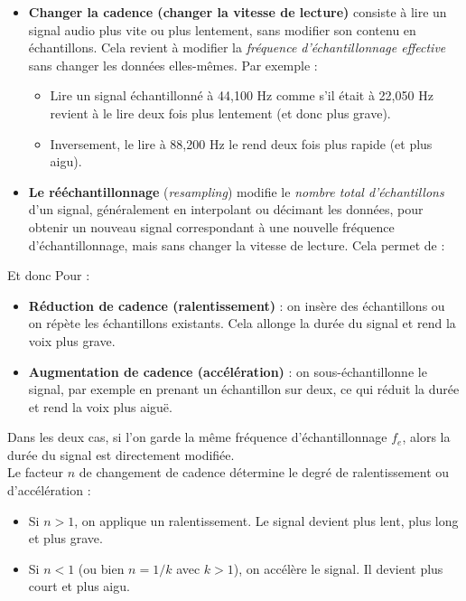 \begin{itemize}
    \item \textbf{Changer la cadence (changer la vitesse de lecture)} consiste à lire un signal audio plus vite ou plus lentement, sans modifier son contenu en échantillons. Cela revient à modifier la \textit{fréquence d’échantillonnage effective} sans changer les données elles-mêmes. Par exemple :
    \begin{itemize}
        \item Lire un signal échantillonné à 44{,}100 Hz comme s’il était à 22{,}050 Hz revient à le lire deux fois plus lentement (et donc plus grave).
        \item Inversement, le lire à 88{,}200 Hz le rend deux fois plus rapide (et plus aigu).
    \end{itemize}

    \item \textbf{Le rééchantillonnage} (\textit{resampling}) modifie le \textit{nombre total d’échantillons} d’un signal, généralement en interpolant ou décimant les données, pour obtenir un nouveau signal correspondant à une nouvelle fréquence d’échantillonnage, mais sans changer la vitesse de lecture. Cela permet de :
\end{itemize}

Et donc Pour :

\begin{itemize}
    \item \textbf{Réduction de cadence (ralentissement)} : on insère des échantillons ou on répète les échantillons existants. Cela allonge la durée du signal et rend la voix plus grave.
    \item \textbf{Augmentation de cadence (accélération)} : on sous-échantillonne le signal, par exemple en prenant un échantillon sur deux, ce qui réduit la durée et rend la voix plus aiguë.
\end{itemize}

Dans les deux cas, si l’on garde la même fréquence d’échantillonnage $f_e$, alors la durée du signal est directement modifiée.\\

Le facteur $n$ de changement de cadence détermine le degré de ralentissement ou d’accélération :

\begin{itemize}
    \item Si $n > 1$, on applique un ralentissement. Le signal devient plus lent, plus long et plus grave.
    \item Si $n < 1$ (ou bien $n = 1/k$ avec $k > 1$), on accélère le signal. Il devient plus court et plus aigu.
\end{itemize}

